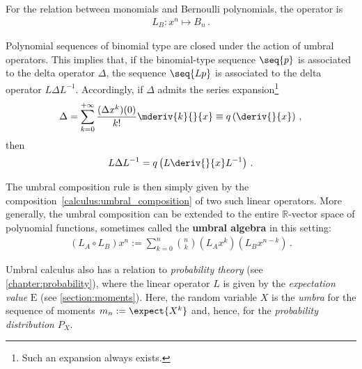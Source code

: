     For the relation between monomials and Bernoulli polynomials, the operator is
    \begin{gather}
        L_B:x^n\mapsto B_n\,.
    \end{gather}

    \begin{property}
        Polynomial sequences of binomial type are closed under the action of umbral operators.  This implies that, if the binomial-type sequence $\seq{p}$ is associated to the delta operator $\Delta$, the sequence $\seq{Lp}$ is associated to the delta operator $L\Delta L^{-1}$. Accordingly, if $\Delta$ admits the series expansion\footnote{Such an expansion always exists.}
        \begin{gather}
            \Delta = \sum_{k=0}^{+\infty}\frac{(\Delta x^k)(0)}{k!}\mderiv{k}{}{x}\equiv q\left(\deriv{}{x}\right)\,,
        \end{gather}
        then
        \begin{gather}
            L\Delta L^{-1}=q\left(L\deriv{}{x}L^{-1}\right)\,.
        \end{gather}
    \end{property}

    The umbral composition rule is then simply given by the composition~\ref{calculus:umbral_composition} of two such linear operators. More generally, the umbral composition can be extended to the entire $\mathbb{R}$-vector space of polynomial functions, sometimes called the \textbf{umbral algebra} in this setting:
    \begin{gather}
        (L_A\circ L_B)x^n := \sum_{k=0}^n{n\choose k}(L_Ax^k)(L_Bx^{n-k})\,.
    \end{gather}

    \begin{example}
        Umbral calculus also has a relation to \textit{probability theory} (see \cref{chapter:probability}), where the linear operator $L$ is given by the \textit{expectation value} $\mathrm{E}$ (see \cref{section:moments}). Here, the random variable $X$ is the \textit{umbra} for the sequence of moments $m_n:=\expect{X^k}$ and, hence, for the \textit{probability distribution} $P_X$.
    \end{example}

